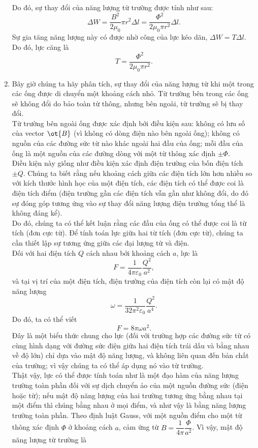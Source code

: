 \begin{loigiai}
\begin{enumerate}[1)]
    Do đó, sự thay đổi của năng lượng từ trường được tính như sau:
    \[\Delta W = \dfrac{B^{2}}{2 \mu_{0}} \pi r^{2} \Delta l = \dfrac{\Phi^{2}}{2 \mu_{0} \pi r^{2}} \Delta l.\]
    Sự gia tăng năng lượng này có được nhờ công của lực kéo dãn, $\Delta W = T \Delta l$. Do đó, lực căng là
    \[T = \dfrac{\Phi^{2}}{2 \mu_{0} \pi r^{2}}.\]  
    \item Bây giờ chúng ta hãy phân tích, sự thay đổi của năng lượng từ  khi một trong các ống được di chuyển một khoảng cách nhỏ. Từ trường bên trong các ống sẽ không đổi do bảo toàn từ thông, nhưng bên ngoài, từ trường sẽ bị thay đổi.\\
    Từ trường bên ngoài ống được xác định bởi điều kiện sau: không có lưu số của vector $\ot{B}$ (vì không có dòng điện nào bên ngoài ống); không có nguồn của các đường sức từ nào khác ngoài hai đầu của ống; mỗi đầu của ống là một nguồn của các đường dòng với một từ thông xác định $\pm \Phi$. \\
    Điều kiện này giống như điều kiện xác định điện trường của bốn điện tích $\pm Q$. Chúng ta biết rằng nếu khoảng cách giữa các điện tích lớn hơn nhiều so với kích thước hình học của một điện tích, các điện tích có thể được coi là điện tích điểm (điện trường gần các điện tích vẫn gần như không đổi, do đó sự đóng góp tương ứng vào sự thay đổi năng lượng điện trường tổng thể là không đáng kể).\\
    Do đó, chúng ta có thể kết luận rằng các đầu của ống có thể được coi là từ tích (đơn cực từ). Để tính toán lực giữa hai từ tích (đơn cực từ), chúng ta cần thiết lập sự tương ứng giữa các đại lượng từ và điện.\\
    Đối với hai điện tích $Q$ cách nhau bởi khoảng cách $a$, lực là 
    \[F=\dfrac{1}{4 \pi \varepsilon_{0}} \dfrac{Q^{2}}{a^{2}},\] 
    và tại vị trí của một điện tích, điện trường của điện tích còn lại có mật độ năng lượng 
    \[\omega = \dfrac{1}{32 \pi^2 \varepsilon_0 }\dfrac{Q^2}{a^4}.\]
    Do đó, ta có thể viết
    \[F = 8\pi \omega a^2.\]
    Đây là một biểu thức chung cho lực (đối với trường hợp các đường sức từ có cùng hình dạng với đường sức điện giữa hai điện tích trái dấu và bằng nhau về độ lớn) chỉ dựa vào mật độ năng lượng, và không liên quan đến bản chất của trường; vì vậy chúng ta có thể áp dụng nó vào từ trường.\\
    Thật vậy, lực có thể được tính toán như là một đạo hàm của năng lượng trường toàn phần đối với sự dịch chuyển ảo của một nguồn đường sức (điện hoặc từ); nếu mật độ năng lượng của hai trường tương ứng bằng nhau tại một điểm thì chúng bằng nhau ở mọi điểm, và như vậy là bằng năng lượng trường toàn phần. Theo định luật Gauss, với một nguồn điểm cho một từ thông xác định $\Phi$ ở khoảng cách $a$, cảm ứng từ $B = \dfrac{1}{4 \pi} \dfrac{\Phi}{a^{2}}$. Vì vậy, mật độ năng lượng từ trường là 

\end{enumerate}
\end{loigiai}
